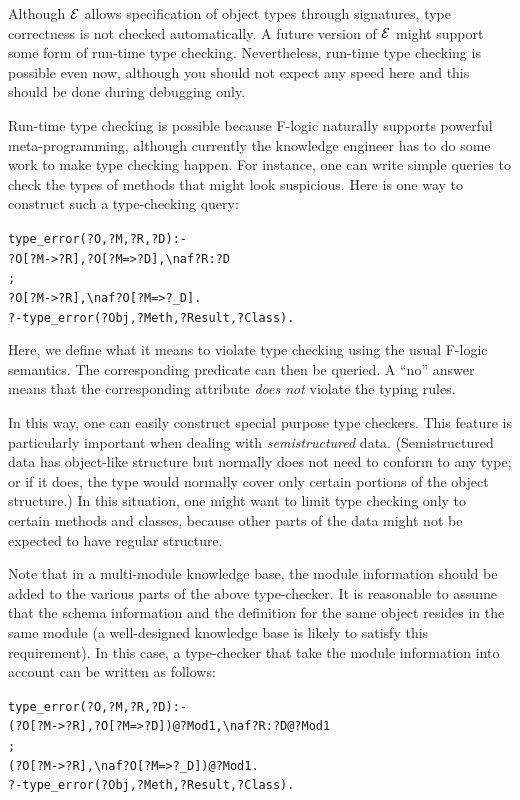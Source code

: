 \documentclass[11pt]{article}
\newcommand{\ERGO}{\mbox{\ensuremath{\cal{E}}\smaller{{\sc{RGO}}}}\xspace}
\newcommand{\FLSYSTEM}{\ERGO}
\newcommand{\bs}{\textbackslash}
\newcommand{\fl}{\mbox{F-logic}\xspace}
\newcommand{\RULELOGNAF}{{\texttt{{\bs}naf}}\xspace}
\begin{document}
Although \FLSYSTEM allows specification of object types through signatures,
type correctness is not checked automatically.
A future version of \FLSYSTEM might support some form of run-time type
checking. Nevertheless, run-time type checking is possible even now,
although you should not expect any speed here and this should be done
during debugging only.

Run-time type checking is possible because \fl naturally supports powerful
meta-programming, although currently the knowledge engineer
has to do some work to
make type checking happen.  For instance, one can write simple
queries to check the types of methods that might look suspicious.  Here is
one way to construct such a type-checking query:
\begin{alltt}
type_error(?O,?M,?R,?D) :-
       ?O[?M->?R], ?O[?M=>?D], \RULELOGNAF ?R:?D
       ;
       ?O[?M->?R], \RULELOGNAF ?O[?M=>?_D].
?- type_error(?Obj,?Meth,?Result,?Class).
\end{alltt}
Here, we define what it means to violate type checking using the usual
\fl semantics. The corresponding predicate can then be queried. A
``no'' answer means that the corresponding attribute \emph{does not}
violate the typing rules.

In this way, one can easily construct special purpose type checkers.  This
feature is particularly important when dealing with \emph{semistructured}
data. (Semistructured data has object-like structure but normally does not
need to conform to any type; or if it does, the type would normally cover
only certain portions of the object structure.) In this situation, one
might want to limit type checking only to certain methods and classes,
because other parts of the data might not be expected to have regular
structure.

Note that in a multi-module knowledge base, the module information should be added
to the various parts of the above type-checker. It is reasonable to assume
that the schema information and the definition for the same object
resides in the same module (a well-designed knowledge base is likely to satisfy
this requirement). In this case, a type-checker that take the module
information into account can be written as follows:
\begin{alltt}
type_error(?O,?M,?R,?D) :-
       (?O[?M->?R], ?O[?M=>?D])@?Mod1, \RULELOGNAF ?R:?D@?Mod1
       ;
       (?O[?M->?R], \RULELOGNAF ?O[?M=>?_D])@?Mod1.
?- type_error(?Obj,?Meth,?Result,?Class).
\end{alltt}
\end{document}
